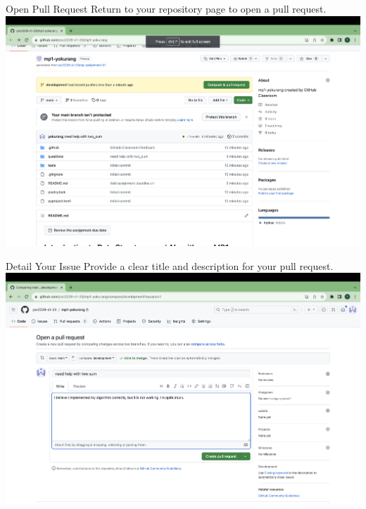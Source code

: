 \documentclass{beamer}
\begin{document}
\begin{frame}{Open Pull Request}
    Return to your repository page to open a pull request.
    \includegraphics[width=\textwidth,height=0.7\textheight,keepaspectratio]{assets/go-to-repository-page.png}
\end{frame}

\begin{frame}{Detail Your Issue}
    Provide a clear title and description for your pull request.
    \includegraphics[width=\textwidth,height=0.7\textheight,keepaspectratio]{assets/write-some-comments-on-the-pull-request.png}
\end{frame}
\end{document}
